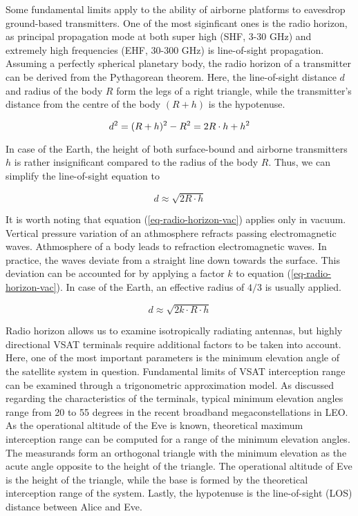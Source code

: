 \documentclass[english, 12pt, a4paper, elec, utf8, a-1b, online]{aaltothesis}
\begin{document}
Some fundamental limits apply to the ability of airborne platforms to eavesdrop ground-based transmitters.
One of the most siginficant ones is the radio horizon, as principal propagation mode at both super high (SHF, 3-30 GHz) and extremely high frequencies (EHF, 30-300 GHz) is line-of-sight propagation.
Assuming a perfectly spherical planetary body, the radio horizon of a transmitter can be derived from the Pythagorean theorem.
Here, the line-of-sight distance $d$ and radius of the body $R$ form the legs of a right triangle, while the transmitter's distance from the centre of the body $(R+h)$ is the hypotenuse.

\begin{equation*}
  d^2=(R+h)^{2}-R^2= 2R \cdot h + h^2 \\
\end{equation*}

In case of the Earth, the height of both surface-bound and airborne transmitters $h$ is rather insignificant compared to the radius of the body $R$. Thus, we can simplify the line-of-sight equation to

\begin{equation} \label{eq-radio-horizon-vac}
  d \approx \sqrt{2R \cdot h}
\end{equation}

It is worth noting that equation (\ref{eq-radio-horizon-vac}) applies only in vacuum.
Vertical pressure variation of an athmosphere refracts passing electromagnetic waves. 
Athmosphere of a body leads to refraction electromagnetic waves. In practice, the waves deviate from a straight line down towards the surface. This deviation can be accounted for by applying a factor $k$ to equation (\ref{eq-radio-horizon-vac}). In case of the Earth, an effective radius of $4/3$ is usually applied.

\begin{equation} \label{eq-radio-horizon-ath}
  d \approx \sqrt{2 k \cdot R \cdot h}
\end{equation}

Radio horizon allows us to examine isotropically radiating antennas, but highly directional VSAT terminals require additional factors to be taken into account.
Here, one of the most important parameters is the minimum elevation angle of the satellite system in question.
Fundamental limits of VSAT interception range can be examined through a trigonometric approximation model.
As discussed regarding the characteristics of the terminals, typical minimum elevation angles range from 20 to 55 degrees in the recent broadband megaconstellations in LEO.
As the operational altitude of the Eve is known, theoretical maximum interception range can be computed for a range of the minimum elevation angles.
The measurands form an orthogonal triangle with the minimum elevation as the acute angle opposite to the height of the triangle.
The operational altitude of Eve is the height of the triangle, while the base is formed by the theoretical interception range of the system.
Lastly, the hypotenuse is the line-of-sight (LOS) distance between Alice and Eve.
\end{document}
